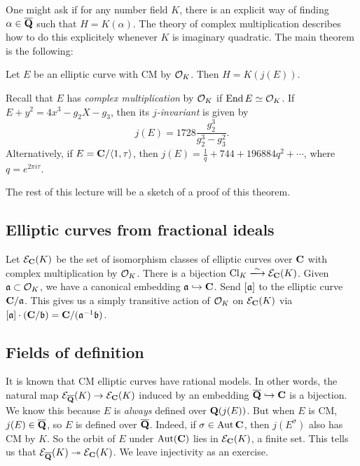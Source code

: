 One might ask if for any number field $K$, there is an explicit way of 
finding $\alpha\in \overline{\mathbf{Q}}$ such that $H=K(\alpha)$. The theory of complex 
multiplication describes how to do this explicitely whenever $K$ is 
imaginary quadratic. The main theorem is the following: 

\begin{theo}
Let $E$ be an elliptic curve with CM by $\mathcal{O}_K$. Then 
$H=K(j(E))$. 
\end{theo}

Recall that $E$ has \emph{complex multiplication} by $\mathcal{O}_K$ if 
$\operatorname{End} E \simeq \mathcal{O}_K$. If $E+y^2=4 x^3-g_2 X-g_3$, then its 
\emph{$j$-invariant} is given by 
\[
  j(E) = 1728 \frac{g_2^3}{g_2^3 - g_3^2} .
\]
Alternatively, if $E=\mathbf{C}/\langle 1,\tau\rangle$, then 
$j(E) = \frac 1 q + 744 + 196884 q^2 + \cdots$, where $q=e^{2\pi i \tau}$. 

The rest of this lecture will be a sketch of a proof of this theorem. 





\subsection{Elliptic curves from fractional ideals}

Let $\mathcal{E}_{\mathbf{C}}(K)$ be the set of isomorphism classes of elliptic curves over 
$\mathbf{C}$ with complex multiplication by $\mathcal{O}_K$. There is a bijection 
$\class_K \iso \cE_\dC(K)$. Given $\mathfrak{a}\subset \mathcal{O}_K$, we have a canonical 
embedding $\mathfrak{a}\hookrightarrow \mathbf{C}$. Send $[\mathfrak{a}]$ to the elliptic curve 
$\mathbf{C}/\mathfrak{a}$. This gives us a simply transitive action of $\mathcal{O}_K$ on 
$\mathcal{E}_{\mathbf{C}}(K)$ via $[\mathfrak{a}]\cdot (\mathbf{C}/\mathfrak{b}) = \mathbf{C}/(\mathfrak{a}^{-1} \mathfrak{b})$. 





\subsection{Fields of definition}

It is known that CM elliptic curves have rational models. In other words, 
the natural map $\mathcal{E}_{\overline{\mathbf{Q}}}(K) \to \mathcal{E}_{\mathbf{C}}(K)$ induced by an 
embedding $\overline{\mathbf{Q}}\hookrightarrow\mathbf{C}$ is a bijection. We know this 
because $E$ is \emph{always} defined over $\mathbf{Q}(j(E))$. But when $E$ is CM, 
$j(E)\in \overline{\mathbf{Q}}$, so $E$ is defined over $\overline{\mathbf{Q}}$. Indeed, if 
$\sigma\in \operatorname{Aut}\mathbf{C}$, then $j(E^\sigma)$ also has CM by $K$. So the 
orbit of $E$ under $\operatorname{Aut}(\mathbf{C})$ lies in $\mathcal{E}_{\mathbf{C}}(K)$, a finite set. 
This tells us that $\mathcal{E}_{\overline{\mathbf{Q}}}(K) \twoheadrightarrow \mathcal{E}_{\mathbf{C}}(K)$. We 
leave injectivity as an exercise. 

